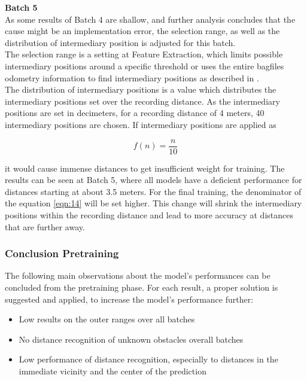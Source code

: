 \textbf{Batch 5}\\
As some results of Batch 4 are shallow, and further analysis concludes that the cause might be an implementation error, the selection range, as well as the distribution of intermediary position is adjusted for this batch.\\ 

The selection range is a setting at Feature Extraction, which limits possible intermediary positions around a specific threshold or uses the entire bagfiles odometry information to find intermediary positions as described in .\\

The distribution of intermediary positions is a value which distributes the intermediary positions set over the recording distance. As the intermediary positions are set in decimeters, for a recording distance of 4 meters, 40 intermediary positions are chosen. If intermediary positions are applied as

\begin{equation}
\label{eqn:14} 
f(n) = \frac{n}{10}
\end{equation}

it would cause immense distances to get insufficient weight for training. The results can be seen at Batch 5, where all models have a deficient performance for distances starting at about 3.5 meters. For the final training, the denominator of the equation \ref{eqn:14} will be set higher. This change will shrink the intermediary positions within the recording distance and lead to more accuracy at distances that are further away.

\subsubsection{Conclusion Pretraining \label{conclusion_pretraining}}
The following main observations about the model's performances can be concluded from the pretraining phase. For each result, a proper solution is suggested and applied, to increase the model's performance further:

\begin{itemize}
\item Low results on the outer ranges over all batches
\item No distance recognition of unknown obstacles overall batches
\item Low performance of distance recognition, especially to distances in the immediate vicinity and the center of the prediction
\end{itemize}


